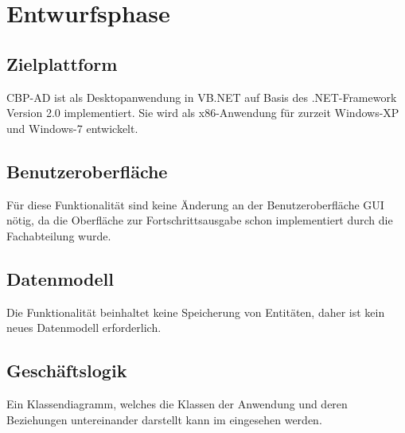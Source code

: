 
\section{Entwurfsphase} 
\label{sec:Entwurfsphase}

\subsection{Zielplattform}
\label{sec:Zielplattform}

\ac{CBP-AD} ist als Desktopanwendung in \acs{VB}.NET auf Basis des .NET-Framework Version 2.0 implementiert.
Sie wird als x86-Anwendung für zurzeit Windows-XP und Windows-7 entwickelt.


\subsection{Benutzeroberfläche}
\label{sec:Benutzeroberflaeche}

Für diese Funktionalität sind keine Änderung an der Benutzeroberfläche \acs{GUI} nötig, da die Oberfläche zur Fortschrittsausgabe schon implementiert durch die Fachabteilung wurde.



\subsection{Datenmodell}
\label{sec:Datenmodell}

Die Funktionalität \gqq{\titel} beinhaltet keine Speicherung von Entitäten, daher ist kein neues Datenmodell erforderlich.


\subsection{Geschäftslogik}
\label{sec:Geschaeftslogik}

Ein Klassendiagramm, welches die Klassen der Anwendung und deren Beziehungen untereinander darstellt kann im  eingesehen werden.


